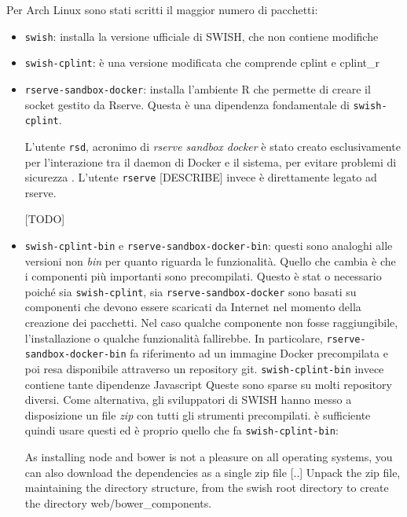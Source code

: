 \documentclass[10pt,titlepage,twoside,a4paper]{report}
\begin{document}
Per Arch Linux sono stati scritti il maggior numero di pacchetti:
\begin{itemize}
    \item \texttt{swish}: installa la versione ufficiale di SWISH, che non 
contiene modifiche
    \item \texttt{swish-cplint}: è una versione modificata che comprende 
cplint e cplint\_r
    \item \texttt{rserve-sandbox-docker}: installa l'ambiente R che permette di 
creare il socket gestito da Rserve. Questa è una dipendenza fondamentale di 
\texttt{swish-cplint}.

L'utente \texttt{rsd}, acronimo di \emph{rserve sandbox docker} è stato creato
esclusivamente per l'interazione tra il daemon di Docker e il sistema, per 
evitare problemi di sicurezza \cite{dockerPrivilegeEscalation0} 
\cite{dockerPrivilegeEscalation1}. L'utente \texttt{rserve} [DESCRIBE] invece è 
direttamente legato ad rserve.

[TODO]

    \item \texttt{swish-cplint-bin} e \texttt{rserve-sandbox-docker-bin}: 
questi sono analoghi alle versioni non \emph{bin} per quanto riguarda le 
funzionalità. Quello che cambia è che i componenti più importanti sono 
precompilati. Questo è stat o necessario poiché sia \texttt{swish-cplint}, 
sia \texttt{rserve-sandbox-docker} sono basati su componenti che devono essere 
scaricati da Internet nel momento della creazione dei pacchetti. Nel caso 
qualche componente non fosse raggiungibile, l'installazione o qualche 
funzionalità fallirebbe. In particolare, \texttt{rserve-sandbox-docker-bin} 
fa riferimento ad un immagine Docker precompilata e poi resa disponibile 
attraverso un repository git. \texttt{swish-cplint-bin} invece contiene tante 
dipendenze Javascript\cite{javascriptDepsSWISH} Queste sono sparse su molti 
repository diversi. Come alternativa, gli sviluppatori 
di SWISH hanno messo a disposizione un file \emph{zip}\cite{swishWebDepsZip} 
con tutti gli strumenti precompilati. è sufficiente quindi usare questi ed 
è proprio quello che fa \texttt{swish-cplint-bin}:
\begin{displayquote}
[..]
As installing node and bower is not a pleasure on all operating systems,
you can also download the dependencies as a single zip file [..]
Unpack the zip file, maintaining the directory structure, from the swish
root directory to create the directory web/bower\_components.
\end{displayquote}
\end{itemize}
\end{document}
